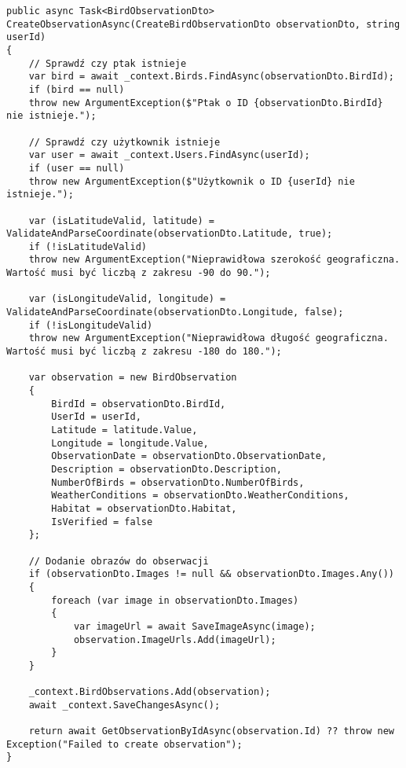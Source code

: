 \begin{lstlisting}[style=csharp, caption={Przykład użycia walidacji danych geograficznych},label={lst:backendwalidacjageograficzna}]
public async Task<BirdObservationDto> CreateObservationAsync(CreateBirdObservationDto observationDto, string userId)
{
	// Sprawdź czy ptak istnieje
	var bird = await _context.Birds.FindAsync(observationDto.BirdId);
	if (bird == null)
	throw new ArgumentException($"Ptak o ID {observationDto.BirdId} nie istnieje.");
	
	// Sprawdź czy użytkownik istnieje
	var user = await _context.Users.FindAsync(userId);
	if (user == null)
	throw new ArgumentException($"Użytkownik o ID {userId} nie istnieje.");
	
	var (isLatitudeValid, latitude) = ValidateAndParseCoordinate(observationDto.Latitude, true);
	if (!isLatitudeValid)
	throw new ArgumentException("Nieprawidłowa szerokość geograficzna. Wartość musi być liczbą z zakresu -90 do 90.");
	
	var (isLongitudeValid, longitude) = ValidateAndParseCoordinate(observationDto.Longitude, false);
	if (!isLongitudeValid)
	throw new ArgumentException("Nieprawidłowa długość geograficzna. Wartość musi być liczbą z zakresu -180 do 180.");
	
	var observation = new BirdObservation
	{
		BirdId = observationDto.BirdId,
		UserId = userId,
		Latitude = latitude.Value,
		Longitude = longitude.Value,
		ObservationDate = observationDto.ObservationDate,
		Description = observationDto.Description,
		NumberOfBirds = observationDto.NumberOfBirds,
		WeatherConditions = observationDto.WeatherConditions,
		Habitat = observationDto.Habitat,
		IsVerified = false
	};
	
	// Dodanie obrazów do obserwacji
	if (observationDto.Images != null && observationDto.Images.Any())
	{
		foreach (var image in observationDto.Images)
		{
			var imageUrl = await SaveImageAsync(image);
			observation.ImageUrls.Add(imageUrl);
		}
	}
	
	_context.BirdObservations.Add(observation);
	await _context.SaveChangesAsync();
	
	return await GetObservationByIdAsync(observation.Id) ?? throw new Exception("Failed to create observation");
}
\end{lstlisting}

